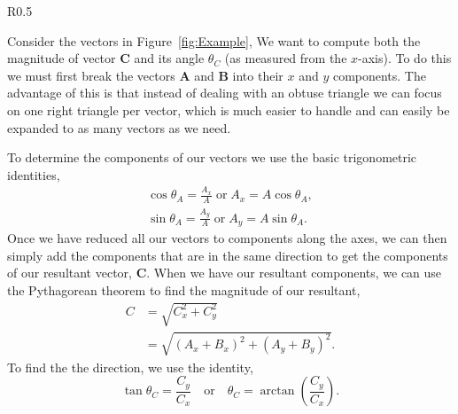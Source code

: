 \documentclass[main.tex]{subfiles}
\begin{document}
\begin{wrapfigure}{R}{0.5\textwidth}
\begin{subfigure}[h]{0.5\textwidth}
\centering
{}
\caption{} \label{fig:VectA}
\end{subfigure}
\caption{}
\vspace{-9\baselineskip}
\end{wrapfigure}

Consider the vectors in Figure~\ref{fig:Example}, We want to compute both the magnitude of vector $\mathbf{C}$ and its angle $\theta_C$ (as measured from the $x$-axis). To do this we must first break the vectors $\mathbf{A}$ and $\mathbf{B}$ into their $x$ and $y$ components. The advantage of this is that instead of dealing with an obtuse triangle we can focus on one right triangle per vector, which is much easier to handle and can easily be expanded to as many vectors as we need.
\FloatBarrier

To determine the components of our vectors we use the basic trigonometric identities,
\begin{align}
\cos\theta_A=\frac{A_x}{A} \; \text{or} \; A_x=A\cos\theta_A,\\
\sin\theta_A=\frac{A_y}{A} \; \text{or} \; A_y=A\sin\theta_A.
\end{align}
Once we have reduced all our vectors to components along the axes, we can then simply add the components that are in the same direction to get the components of our resultant vector, $\mathbf{C}.$ When we have our resultant components, we can use the Pythagorean theorem to find the magnitude of our resultant,
\begin{align}
C&=\sqrt{C_x^2+C_y^2}\nonumber\\
&=\sqrt{(A_x+B_x)^2+(A_y+B_y)^2}.
\end{align}
To find the the direction, we use the identity,
\begin{equation}
\tan\theta_C=\frac{C_y}{C_x} \quad \text{or} \quad \theta_C=\arctan\left(\frac{C_y}{C_x}\right).
\end{equation}
\end{document}
